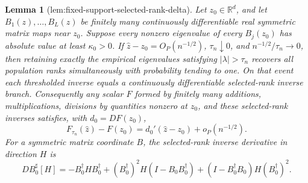 \documentclass{article}
\newtheorem{lemma}{Lemma}
\begin{document}
\begin{lemma}[lem:fixed-support-selected-rank-delta]\label{lem:fixed-support-selected-rank-delta}
Let \(z_0\in\mathbb R^d\), and let \(B_1(z),\ldots,B_L(z)\) be finitely many continuously differentiable real symmetric matrix maps near \(z_0\).  Suppose every nonzero eigenvalue of every \(B_j(z_0)\) has absolute value at least \(\kappa_0>0\).  If \(\widehat z-z_0=O_P(n^{-1/2})\), \(\tau_n\downarrow0\), and \(n^{-1/2}/\tau_n\to0\), then retaining exactly the empirical eigenvalues satisfying \(|\lambda|>\tau_n\) recovers all population ranks simultaneously with probability tending to one.  On that event each thresholded inverse equals a continuously differentiable selected-rank inverse branch.  Consequently any scalar \(F\) formed by finitely many additions, multiplications, divisions by quantities nonzero at \(z_0\), and these selected-rank inverses satisfies, with \(d_0=DF(z_0)\),
\[
F_{\tau_n}(\widehat z)-F(z_0)=d_0'(\widehat z-z_0)+o_P(n^{-1/2}).
\]
For a symmetric matrix coordinate \(B\), the selected-rank inverse derivative in direction \(H\) is
\[
DB_0^\sharp[H]
=-B_0^\dagger HB_0^\dagger
+(B_0^\dagger)^2H(I-B_0B_0^\dagger)
+(I-B_0^\dagger B_0)H(B_0^\dagger)^2.
\]
\end{lemma}
\end{document}
